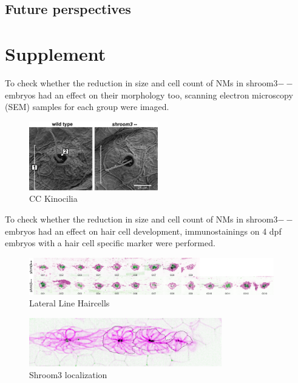 \documentclass[11pt,singlespacinge,twoside]{reedthesis} %
\begin{document}
\hypertarget{future-perspectives}{%
\section{Future perspectives}\label{future-perspectives}}

\appendix

\hypertarget{supplement}{%
\chapter{Supplement}\label{supplement}}

To check whether the reduction in size and cell count of NMs in shroom3\(--\) embryos had an effect on their morphology too, scanning electron microscopy (SEM) samples for each group were imaged.


\begin{figure}

{\centering \includegraphics[width=0.50\textwidth]{figures/supp/sem} 

}

\caption[CC Kinocilia]{CC Kinocilia}\label{fig:suppsem}
\end{figure}
To check whether the reduction in size and cell count of NMs in shroom3\(--\) embryos had an effect on hair cell development, immunostainings on 4 dpf embryos with a hair cell specific marker were performed.


\begin{figure}

{\centering \includegraphics[width=0.95\textwidth]{figures/supp/ll_hc} 

}

\caption[Lateral Line Haircells]{Lateral Line Haircells}\label{fig:suppllhc}
\end{figure}

\begin{figure}

{\centering \includegraphics[width=0.75\textwidth]{figures/supp/loc} 

}

\caption[Shroom3 localization]{Shroom3 localization}\label{fig:supploc}
\end{figure}
\end{document}
